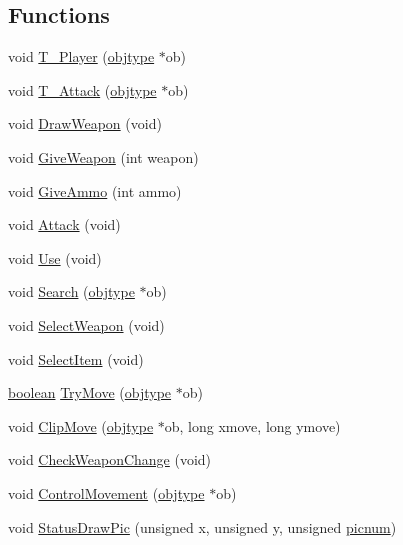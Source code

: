 \subsection*{Functions}
\begin{DoxyCompactItemize}
\item 
void \hyperlink{WL__AGENT_8C_a146c62d526ddb53a04fe11af48e91c96}{T\_\-Player} (\hyperlink{structobjstruct}{objtype} $\ast$ob)
\item 
void \hyperlink{WL__AGENT_8C_a0cce1c4b64372c27c6ff79e6fb397772}{T\_\-Attack} (\hyperlink{structobjstruct}{objtype} $\ast$ob)
\item 
void \hyperlink{WL__AGENT_8C_a0b198c7d98710fffb49091dae4fc6122}{DrawWeapon} (void)
\item 
void \hyperlink{WL__AGENT_8C_aabcbbb80ba8c11b87f33bd15707410c6}{GiveWeapon} (int weapon)
\item 
void \hyperlink{WL__AGENT_8C_af6a9d18983cf35f34e0cf72dc1af934e}{GiveAmmo} (int ammo)
\item 
void \hyperlink{WL__AGENT_8C_a0c4bf51d64253df2bcb951f27fb00009}{Attack} (void)
\item 
void \hyperlink{WL__AGENT_8C_adc24d3d235d4bcf9395baf4ec0236d55}{Use} (void)
\item 
void \hyperlink{WL__AGENT_8C_a1260045e2f1ee6eb8f7537f1025e889b}{Search} (\hyperlink{structobjstruct}{objtype} $\ast$ob)
\item 
void \hyperlink{WL__AGENT_8C_a989e44d07e9bcaada66fca71b72eaf1c}{SelectWeapon} (void)
\item 
void \hyperlink{WL__AGENT_8C_ad79707913bcf532f74ea70cf354f902c}{SelectItem} (void)
\item 
\hyperlink{ID__HEAD_8H_a7c6368b321bd9acd0149b030bb8275ed}{boolean} \hyperlink{WL__AGENT_8C_aa96ec78c47832d4ff39bc3fadf9e6c3c}{TryMove} (\hyperlink{structobjstruct}{objtype} $\ast$ob)
\item 
void \hyperlink{WL__AGENT_8C_a2a36d44974095d5ab513f7ad1e50376b}{ClipMove} (\hyperlink{structobjstruct}{objtype} $\ast$ob, long xmove, long ymove)
\item 
void \hyperlink{WL__AGENT_8C_a4941089cd324d9a04dfd2f43df4a017c}{CheckWeaponChange} (void)
\item 
void \hyperlink{WL__AGENT_8C_a6091384ff3bca148557c73627df60b77}{ControlMovement} (\hyperlink{structobjstruct}{objtype} $\ast$ob)
\item 
void \hyperlink{WL__AGENT_8C_adc83960f6d18ebc42df7465f6bbc0e75}{StatusDrawPic} (unsigned x, unsigned y, unsigned \hyperlink{WL__TEXT_8C_a38ee8916c0c328929ad672895daca6d6}{picnum})

\end{DoxyCompactItemize}
